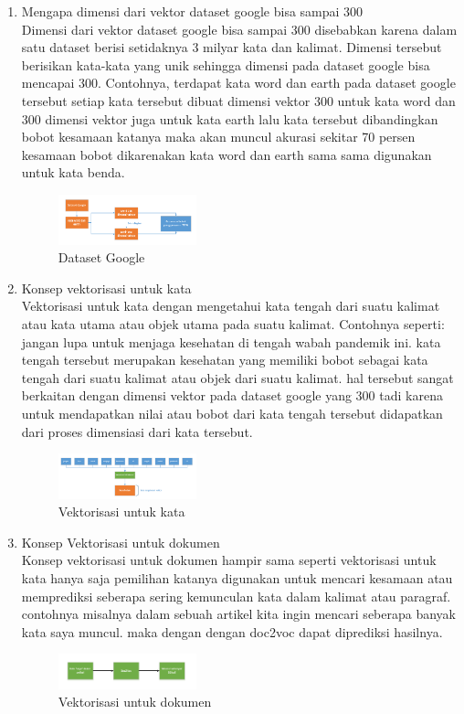 \begin{enumerate}
\item Mengapa dimensi dari vektor dataset google bisa sampai 300\\
Dimensi dari vektor dataset google bisa sampai 300 disebabkan karena dalam satu dataset berisi setidaknya 3 milyar kata dan kalimat. Dimensi tersebut berisikan kata-kata yang unik sehingga dimensi pada dataset google bisa mencapai 300.
Contohnya, terdapat kata word dan earth pada dataset google tersebut setiap kata tersebut dibuat dimensi vektor 300 untuk kata word dan 300 dimensi vektor juga untuk kata earth lalu kata tersebut dibandingkan bobot kesamaan katanya maka akan muncul akurasi sekitar 70 persen kesamaan bobot dikarenakan kata word dan earth sama sama digunakan untuk kata benda.
\hfill\break
	\begin{figure}[H]
		\includegraphics[width=4cm]{figures/1174054/5/2.png}
		\centering
		\caption{Dataset Google}
	\end{figure}

\item Konsep vektorisasi untuk kata\\
Vektorisasi untuk kata dengan mengetahui kata tengah dari suatu kalimat atau kata utama atau objek utama pada suatu kalimat. Contohnya seperti: jangan lupa untuk menjaga kesehatan di tengah wabah pandemik ini. kata tengah tersebut merupakan kesehatan yang memiliki bobot sebagai kata tengah dari suatu kalimat atau objek dari suatu kalimat. hal tersebut sangat berkaitan dengan dimensi vektor pada dataset google yang 300 tadi karena untuk mendapatkan nilai atau bobot dari kata tengah tersebut didapatkan dari proses dimensiasi dari kata tersebut.
\hfill\break
	\begin{figure}[H]
		\includegraphics[width=4cm]{figures/1174054/5/3.png}
		\centering
		\caption{Vektorisasi untuk kata}
	\end{figure}

\item Konsep Vektorisasi untuk dokumen\\
Konsep vektorisasi untuk dokumen hampir sama seperti vektorisasi untuk kata hanya saja pemilihan katanya digunakan untuk mencari kesamaan atau memprediksi seberapa sering kemunculan kata dalam kalimat atau paragraf.
contohnya misalnya dalam sebuah artikel kita ingin mencari seberapa banyak kata saya muncul. maka dengan dengan doc2voc dapat diprediksi hasilnya.
\hfill\break
	\begin{figure}[H]
		\includegraphics[width=4cm]{figures/1174054/5/4.png}
		\centering
		\caption{Vektorisasi untuk dokumen}
	\end{figure}


\end{enumerate}
